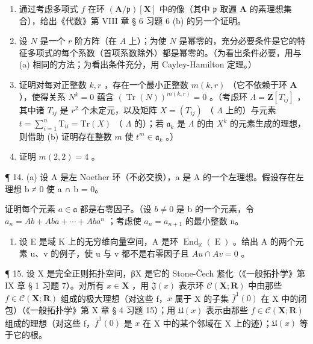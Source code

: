 \begin{enumerate}
\def\labelenumi{(\alph{enumi})}
\item
  通过考虑多项式 \(f\) 在环 \((\mathbf{A} / \mathfrak{p})[\mathbf{X}]\) 中的像（其中 \(\mathfrak{p}\) 取遍 \(\mathbf{A}\) 的素理想集合），给出《代数》第 VIII 章 § 6 习题 6 (b) 的另一个证明。
\item
  设 \(N\) 是一个 \(r\) 阶方阵（在 \(A\) 上）；为使 \(N\) 是幂零的，充分必要条件是它的特征多项式的每个系数（首项系数除外）都是幂零的。（为看出条件必要，用与 (a) 相同的方法；为看出条件充分，用 Cayley-Hamilton 定理。）
\item
  证明对每对正整数 \(k, r\) ，存在一个最小正整数 \(m(k, r)\) （它不依赖于环 \(\mathbf{A}\) ），使得关系 \(N^k = 0\) 蕴含 \((\operatorname{Tr}(N))^{m(k,r)} = 0\) 。（考虑环 \(\Lambda = \mathbf{Z}[T_{ij}]\) ，其中诸 \(T_{ij}\) 是 \(r^2\) 个未定元，以及矩阵 \(X = (T_{ij})\) （ \(\Lambda\) 上的）与元素 \(t = \sum_{i=1}^{n} \mathrm{T}_{ii} = \mathrm{Tr}(X)\) （ \(\Lambda\) 的）；若 \(\mathfrak{a}_k\) 是 \(\Lambda\) 的由 \(X^k\) 的元素生成的理想，则借助 (b) 证明存在整数 \(m\) 使 \(t^m \in \mathfrak{a}_k\) 。）
\item
  证明 \(m(2, 2) = 4\) 。
\end{enumerate}

¶ 14. (a) 设 A 是左 Noether 环（不必交换），a 是 A 的一个左理想。假设存在左理想 b ≠ 0 使 a ∩ b = 0。

证明每个元素 \(a \in \mathfrak{a}\) 都是右零因子。（设 \(b \neq 0\) 是 b 的一个元素，令 \(a_{n} = Ab + Aba + \cdots + Aba^{n}\) ；考虑使 \(a_{n} = a_{n+1}\) 的最小整数 n。

\begin{enumerate}
\def\labelenumi{(\alph{enumi})}
\setcounter{enumi}{1}
\tightlist
\item
  设 E 是域 K 上的无穷维向量空间，A 是环 \(\operatorname{End}_{\mathbb{K}}(\operatorname{E})\) 。给出 A 的两个元素 u、v 的例子，使 u 与 v 都不是右零因子且 \(Au \cap Av = 0\) 。
\end{enumerate}

¶ 15. 设 X 是完全正则拓扑空间，βX 是它的 Stone-Čech 紧化（《一般拓扑学》第 IX 章 § 1 习题 7）。对所有 \(x \in \mathbf{X}\) ，用 \(\mathfrak{J}(x)\) 表示环 \(\mathcal{C}(\mathbf{X}; \mathbf{R})\) 中由那些 \(f \in \mathcal{C}(\mathbf{X}; \mathbf{R})\) 组成的极大理想（对这些 f，\(x\) 属于 X 的子集 \(\bar{f}^1(0)\) 在 X 中的闭包）（《一般拓扑学》第 X 章 § 4 习题 15）；用 \(\mathfrak{U}(x)\) 表示由那些 \(f \in \mathcal{C}(\mathbf{X}; \mathbf{R})\) 组成的理想（对这些 f，\(\bar{f}^1(0)\) 是 \(x\) 在 X 中的某个邻域在 X 上的迹）；\(\mathfrak{U}(x)\) 等于它的根。

